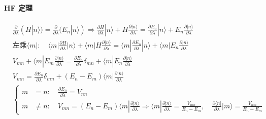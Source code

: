 \documentclass[../../main.tex]{subfiles}
\begin{document}
\paragraph{HF 定理}
\begin{align*}
    &\frac{\partial}{\partial\lambda}(H|n\rangle) = \frac{\partial}{\partial\lambda}(E_{n}|n\rangle)\Rightarrow \frac{\partial H}{\partial\lambda}|n\rangle + H\frac{\partial|n\rangle}{\partial\lambda} = \frac{\partial E_{n}}{\partial\lambda}|n\rangle + E_{n}\frac{\partial|n\rangle}{\partial\lambda}\\
    &\text{左乘}\langle m|:\quad\langle m|\frac{\partial H}{\partial\lambda}|n\rangle + \langle m|H\frac{\partial|n\rangle }{\partial\lambda} = \langle m|\frac{\partial E_{n}}{\partial\lambda}|n\rangle + \langle m|E_{n}\frac{\partial |n\rangle}{\partial\lambda}\\
    &V_{mn} + \langle m|E_{m}\frac{\partial|n\rangle }{\partial\lambda} = \frac{\partial E_{n}}{\partial\lambda}\delta_{mn} + \langle m|E_{n}\frac{\partial|n\rangle}{\partial\lambda}\\
    &V_{mn} = \frac{\partial E_{n}}{\partial\lambda}\delta_{mn} + (E_{n}-E_{m})\langle m|\frac{\partial|n\rangle}{\partial\lambda} \\
    &\left\{\begin{aligned}
        m&=n:\quad\frac{\partial E_{n}}{\partial\lambda} = V_{nn}\\
        m&\neq n:\quad V_{mn} = (E_{n}-E_{m})\langle m|\frac{\partial |n\rangle}{\partial\lambda}\Rightarrow \langle m|\frac{\partial|n\rangle}{\partial\lambda} = \frac{V_{mn}}{E_{n}-E_{m}},\quad \frac{\partial\langle n|}{\partial\lambda}|m\rangle = \frac{V_{nm}}{E_{n}-E_{m}}
    \end{aligned}\right.
\end{align*}
\end{document}
